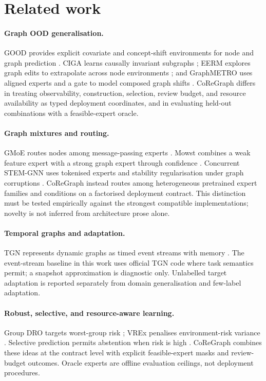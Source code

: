 \section{Related work}

\paragraph{Graph OOD generalisation.}
GOOD provides explicit covariate and concept-shift environments for node and
graph prediction \cite{gui2022good}. CIGA learns causally invariant subgraphs
\cite{chen2022ciga}; EERM explores graph edits to extrapolate across node
environments \cite{wu2022eerm}; and GraphMETRO uses aligned experts and a gate
to model composed graph shifts \cite{wu2024graphmetro}. CoReGraph differs in
treating observability, construction, selection, review budget, and resource
availability as typed deployment coordinates, and in evaluating held-out
combinations with a feasible-expert oracle.

\paragraph{Graph mixtures and routing.}
GMoE routes nodes among message-passing experts \cite{wang2023gmoe}. Mowst
combines a weak feature expert with a strong graph expert through confidence
\cite{zeng2024mowst}. Concurrent STEM-GNN uses tokenised experts and stability
regularisation under graph corruptions \cite{guo2026stem}. CoReGraph instead
routes among heterogeneous pretrained expert families and conditions on a
factorised deployment contract. This distinction must be tested empirically
against the strongest compatible implementations; novelty is not inferred from
architecture prose alone.

\paragraph{Temporal graphs and adaptation.}
TGN represents dynamic graphs as timed event streams with memory
\cite{rossi2020tgn}. The event-stream baseline in this work uses official TGN
code where task semantics permit; a snapshot approximation is diagnostic only.
Unlabelled target adaptation is reported separately from domain
generalisation and few-label adaptation.

\paragraph{Robust, selective, and resource-aware learning.}
Group DRO targets worst-group risk \cite{sagawa2020groupdro}; VREx penalises
environment-risk variance \cite{krueger2021vrex}. Selective prediction permits
abstention when risk is high \cite{geifman2017selective}. CoReGraph combines
these ideas at the contract level with explicit feasible-expert masks and
review-budget outcomes. Oracle experts are offline evaluation ceilings, not
deployment procedures.
